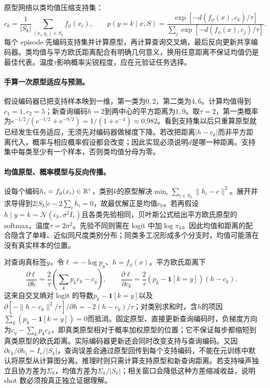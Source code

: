 原型网络以类均值压缩支持集\cite{snell2017proto}：
\begin{equation}
 c_k=\frac1{|S_k|}\sum_{(x_i,y_i)\in S_k}f_\phi(x_i),\qquad
 p(y=k\mid x,S)=\frac{\exp[-d(f_\phi(x),c_k)/\tau]}
 {\sum_j\exp[-d(f_\phi(x),c_j)/\tau]}.
\end{equation}
每个 episode 先编码支持集并计算原型，再计算查询交叉熵，最后反向更新共享编码器。类均值与平方欧氏距离配合有明确几何意义，换用任意距离不保证均值仍是最佳代表。温度$\tau$影响概率尖锐程度，应在元验证任务选择。

\paragraph{手算一次原型适应与预测。}
假设编码器已把支持样本映到一维，第一类为$0,2$，第二类为$4,6$。计算均值得到$c_1=1,c_2=5$；新查询编码$h=2$到两中心的平方距离为$1,9$。取$\tau=2$，第一类概率为$e^{-1/2}/(e^{-1/2}+e^{-9/2})=1/(1+e^{-4})\approx0.982$。看到支持集以后只重算原型就已经发生任务适应，无须先对编码器做梯度下降。若改把距离$|h-c_k|$而非平方距离代入，概率与相应概率假设都会改变；因此实现必须说明$d$是哪一种距离。支持集中每类至少有一个样本，否则类均值分母为零。

\paragraph{均值原型、概率模型与反向传播。}
设每个编码$h_i=f_\phi(x_i)\in\mathbb{R}^r$，类别$k$的原型解决$\min_c\sum_{i\in S_k}\|h_i-c\|^2$。展开并求导得到$2|S_k|c-2\sum_ih_i=0$，故最优解正是均值$c_k$。若再假设$h\mid y=k\sim\mathcal N(c_k,\sigma^2I_r)$且各类先验相同，贝叶斯公式给出平方欧氏原型的 softmax，温度$\tau=2\sigma^2$。先验不同则需在 logit 中加$\log\pi_k$。因此均值和距离的配合隐含了单峰、近似同尺度类别分布；同类多工况形成多个分支时，均值可能落在没有真实样本的位置。

对查询真标签$y$，令$\ell=-\log p_y$、$h=f_\phi(x)$。平方欧氏距离下
\begin{equation}
 \frac{\partial\ell}{\partial h}
 =\frac2\tau\left(\sum_kp_kc_k-c_y\right),\qquad
 \frac{\partial\ell}{\partial c_k}
 =\frac2\tau(p_k-\mathbf1[k=y])(h-c_k).
\end{equation}
这来自交叉熵对 logit 的导数$p_k-\mathbf1[k=y]$以及$\partial[-\|h-c_k\|^2/\tau]/\partial h=-2(h-c_k)/\tau$；对类别求和时，含$h$的项因$\sum_k(p_k-\mathbf1[k=y])=0$而抵消。固定原型、直接更新查询编码时，负梯度方向为$c_y-\sum_kp_kc_k$，即真类原型相对于概率加权原型的位置；它不保证每步都缩短到真类原型的欧氏距离。实际编码器更新还会同时改变支持与查询编码。又因$\partial c_k/\partial h_i=I_r/|S_k|$，查询误差会通过原型回传到每个支持编码，不能在元训练中默认将原型从计算图分离。推理时则只需计算支持原型和新查询距离。若支持噪声独立且协方差为$\Sigma_k$，均值方差为$\Sigma_k/|S_k|$；相关窗口会降低这种方差缩减收益，说明 shot 数必须按真正独立证据理解。

